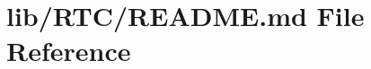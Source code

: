 \hypertarget{lib_2_r_t_c_2_r_e_a_d_m_e_8md}{}\section{lib/\+R\+T\+C/\+R\+E\+A\+D\+ME.md File Reference}
\label{lib_2_r_t_c_2_r_e_a_d_m_e_8md}
